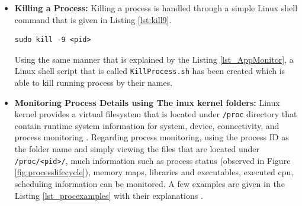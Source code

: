\begin{itemize}
	\item \textbf{Killing a Process:} Killing a process is handled through a simple Linux shell command that is given in Listing \ref{lst:kill9}.
	\begin{lstlisting}[caption={Killing processes from Linux shell},label={lst:kill9},style=bash]
		sudo kill -9 <pid>
	\end{lstlisting}
	Using the same manner that is explained by the Listing \ref{lst_AppMonitor}, a Linux shell script that is called \texttt{KillProcess.sh} has been created which is able to kill running process by their names.
	\item \textbf{Monitoring Process Details using The inux kernel folders:} Linux kernel provides a virtual filesystem that is located under \texttt{/proc} directory that contain runtime system information for system, device, connectivity, and process monitoring \cite{linuxproc}. Regarding process monitoring, using the process ID as the folder name and simply viewing the files that are located under \texttt{/proc/<pid>/}, much information such as process status (observed in Figure \ref{fig:processlifecycle}), memory maps, libraries and executables, executed cpu, scheduling information can be monitored. A few examples are given in the Listing \ref{lst_procexamples} with their explanations \cite{linuxproc}.
	
	
\end{itemize} 
